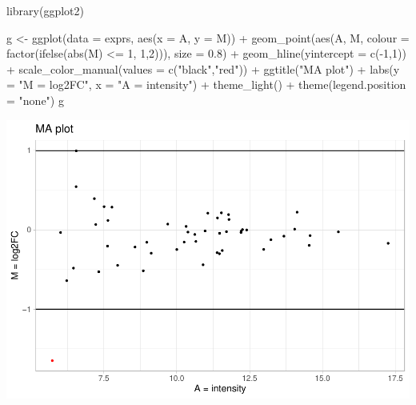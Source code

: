 \documentclass[
]{book}
\newenvironment{Shaded}{\begin{snugshade}}{\end{snugshade}}
\newcommand{\AttributeTok}[1]{\textcolor[rgb]{0.77,0.63,0.00}{#1}}
\newcommand{\DecValTok}[1]{\textcolor[rgb]{0.00,0.00,0.81}{#1}}
\newcommand{\FloatTok}[1]{\textcolor[rgb]{0.00,0.00,0.81}{#1}}
\newcommand{\FunctionTok}[1]{\textcolor[rgb]{0.00,0.00,0.00}{#1}}
\newcommand{\NormalTok}[1]{#1}
\newcommand{\OtherTok}[1]{\textcolor[rgb]{0.56,0.35,0.01}{#1}}
\newcommand{\SpecialCharTok}[1]{\textcolor[rgb]{0.00,0.00,0.00}{#1}}
\newcommand{\StringTok}[1]{\textcolor[rgb]{0.31,0.60,0.02}{#1}}
\begin{document}
\begin{Shaded}
\begin{Highlighting}[]
\FunctionTok{library}\NormalTok{(ggplot2)}

\NormalTok{g }\OtherTok{\textless{}{-}} \FunctionTok{ggplot}\NormalTok{(}\AttributeTok{data =}\NormalTok{ exprs, }\FunctionTok{aes}\NormalTok{(}\AttributeTok{x =}\NormalTok{ A, }\AttributeTok{y =}\NormalTok{ M)) }\SpecialCharTok{+}
  \FunctionTok{geom\_point}\NormalTok{(}\FunctionTok{aes}\NormalTok{(A, M, }\AttributeTok{colour =} \FunctionTok{factor}\NormalTok{(}\FunctionTok{ifelse}\NormalTok{(}\FunctionTok{abs}\NormalTok{(M) }\SpecialCharTok{\textless{}=} \DecValTok{1}\NormalTok{, }\DecValTok{1}\NormalTok{,}\DecValTok{2}\NormalTok{))), }\AttributeTok{size =} \FloatTok{0.8}\NormalTok{) }\SpecialCharTok{+} 
  \FunctionTok{geom\_hline}\NormalTok{(}\AttributeTok{yintercept =} \FunctionTok{c}\NormalTok{(}\SpecialCharTok{{-}}\DecValTok{1}\NormalTok{,}\DecValTok{1}\NormalTok{)) }\SpecialCharTok{+}
  \FunctionTok{scale\_color\_manual}\NormalTok{(}\AttributeTok{values =} \FunctionTok{c}\NormalTok{(}\StringTok{"black"}\NormalTok{,}\StringTok{"red"}\NormalTok{)) }\SpecialCharTok{+}
  \FunctionTok{ggtitle}\NormalTok{(}\StringTok{"MA plot"}\NormalTok{) }\SpecialCharTok{+} 
  \FunctionTok{labs}\NormalTok{(}\AttributeTok{y =} \StringTok{"M = log2FC"}\NormalTok{, }\AttributeTok{x =} \StringTok{"A = intensity"}\NormalTok{) }\SpecialCharTok{+} 
  \FunctionTok{theme\_light}\NormalTok{() }\SpecialCharTok{+} \FunctionTok{theme}\NormalTok{(}\AttributeTok{legend.position =} \StringTok{"none"}\NormalTok{)}
\NormalTok{g}
\end{Highlighting}
\end{Shaded}

\includegraphics{images/unnamed-chunk-114-1.pdf}
\end{document}
